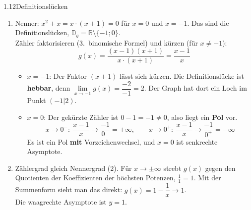 \begin{loesung}{1.12}{Definitionslücken}
\begin{enumerate}[label=\alph*)]
  \item Nenner: $x^2+x = x\cdot(x+1) = 0$ für $x=0$ und $x=-1$. Das sind die Definitionslücken, $\mathds{D}_g = \mathds{R}\setminus\{-1;0\}$.\\
  Zähler faktorisieren (3.~binomische Formel) und kürzen (für $x\neq -1$):
  \[g(x) = \dfrac{(x-1)(x+1)}{x\cdot(x+1)} = \dfrac{x-1}{x}\]
  \begin{itemize}
    \item $x=-1$: Der Faktor $(x+1)$ lässt sich kürzen. Die Definitionslücke ist \textbf{hebbar}, denn $\lim\limits_{x\longrightarrow -1} g(x) = \dfrac{-2}{-1} = 2$. Der Graph hat dort ein \glqq Loch\grqq{} im Punkt $(-1|2)$.
    \item $x=0$: Der gekürzte Zähler ist $0-1=-1\neq 0$, also liegt ein \textbf{Pol} vor.
    \[x\longrightarrow 0^-:\ \dfrac{x-1}{x}\longrightarrow\dfrac{-1}{0^-} = +\infty,\qquad x\longrightarrow 0^+:\ \dfrac{x-1}{x}\longrightarrow\dfrac{-1}{0^+} = -\infty\]
    Es ist ein Pol \textbf{mit} Vorzeichenwechsel, und $x=0$ ist senkrechte Asymptote.
  \end{itemize}
  \item Zählergrad gleich Nennergrad ($2$). Für $x\longrightarrow\pm\infty$ strebt $g(x)$ gegen den Quotienten der Koeffizienten der höchsten Potenzen, $\frac{1}{1}=1$. Mit der Summenform sieht man das direkt: $g(x) = 1-\dfrac{1}{x}\longrightarrow 1$.\\
  Die waagrechte Asymptote ist $y=1$.
\end{enumerate}
\end{loesung}

